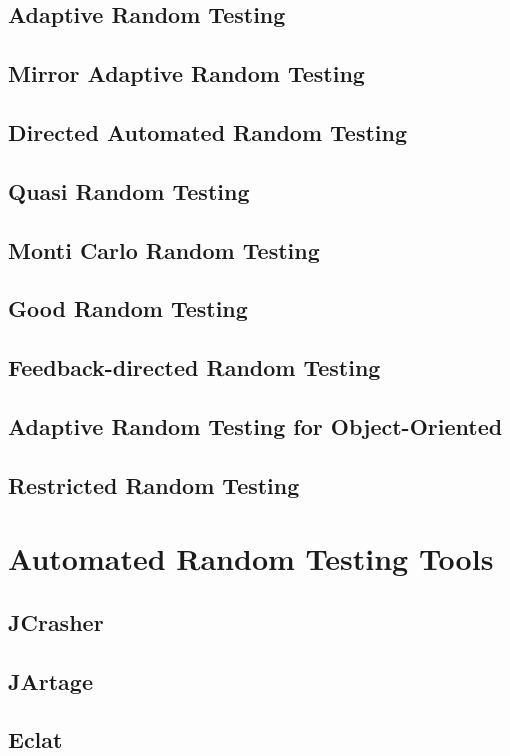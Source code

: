 \subsection{Adaptive Random Testing}
\subsection{Mirror Adaptive Random Testing}
\subsection{Directed Automated Random Testing}
\subsection{Quasi Random Testing}
\subsection{Monti Carlo Random Testing}
\subsection{Good Random Testing}
\subsection{Feedback-directed Random Testing}
\subsection{Adaptive Random Testing for Object-Oriented}
\subsection{Restricted Random Testing}

\section{Automated Random Testing Tools}
\subsection{JCrasher}
\subsection{JArtage}
\subsection{Eclat}
